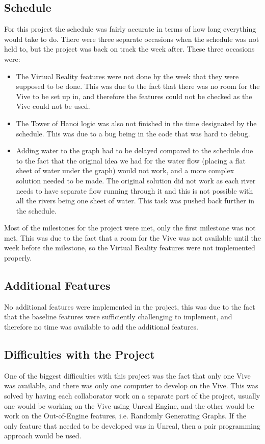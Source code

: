 \subsection{Schedule}
	For this project the schedule was fairly accurate in terms of how long everything would take to do. There were three separate occasions when the schedule was not held to, but the project was back on track the week after. These three occasions were:
	\begin{itemize}
		\item The Virtual Reality features were not done by the week that they were supposed to be done. This was due to the fact that there was no room for the Vive to be set up in, and therefore the features could not be checked as the Vive could not be used.
		\item The Tower of Hanoi logic was also not finished in the time designated by the schedule. This was due to a bug being in the code that was hard to debug.
		\item Adding water to the graph had to be delayed compared to the schedule due to the fact that the original idea we had for the water flow (placing a flat sheet of water under the graph) would not work, and a more complex solution needed to be made. The original solution did not work as each river needs to have separate flow running through it and this is not possible with all the rivers being one sheet of water. This task was pushed back further in the schedule.
	\end{itemize}

	Most of the milestones for the project were met, only the first milestone was not met. This was due to the fact that a room for the Vive was not available until the week before the milestone, so the Virtual Reality features were not implemented properly.

\subsection{Additional Features}
	No additional features were implemented in the project, this was due to the fact that the baseline features were sufficiently challenging to implement, and therefore no time was available to add the additional features.

\subsection{Difficulties with the Project}
	One of the biggest difficulties with this project was the fact that only one Vive was available, and there was only one computer to develop on the Vive. This was solved by having each collaborator work on a separate part of the project, usually one would be working on the Vive using Unreal Engine, and the other would be work on the Out-of-Engine features, i.e. Randomly Generating Graphs. If the only feature that needed to be developed was in Unreal, then a pair programming approach would be used.
	
